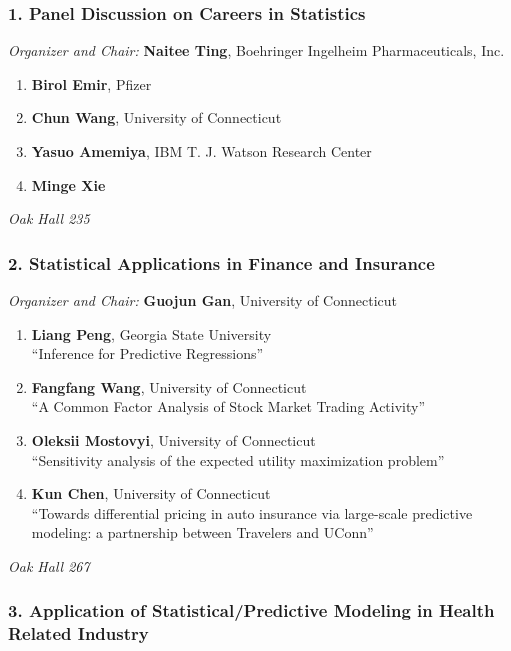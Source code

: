 \subsubsection*{1. Panel Discussion on Careers in Statistics}

\emph{Organizer and Chair:} \textbf{Naitee Ting}, Boehringer Ingelheim Pharmaceuticals, Inc.

\begin{enumerate}
\item \textbf{Birol Emir}, Pfizer 
\item \textbf{Chun Wang}, University of Connecticut 
\item \textbf{Yasuo Amemiya}, IBM T. J. Watson Research Center 
\item \textbf{Minge Xie} 
\end{enumerate}

\emph{Oak Hall 235} \\[.5em]

\subsubsection*{2. Statistical Applications in Finance and Insurance}

\emph{Organizer and Chair:} \textbf{Guojun Gan}, University of Connecticut

\begin{enumerate}
\item \textbf{Liang Peng}, Georgia State University \\
``Inference for Predictive Regressions''
\item \textbf{Fangfang Wang}, University of Connecticut \\
``A Common Factor Analysis of  Stock Market Trading Activity''
\item \textbf{Oleksii Mostovyi}, University of Connecticut \\
``Sensitivity analysis of the expected utility maximization problem''
\item \textbf{Kun Chen}, University of Connecticut \\
``Towards differential pricing in auto insurance via large-scale predictive modeling: a partnership between Travelers and UConn''
\end{enumerate}

\emph{Oak Hall 267} \\[.5em]

\subsubsection*{3. Application of Statistical/Predictive Modeling in Health Related Industry}

